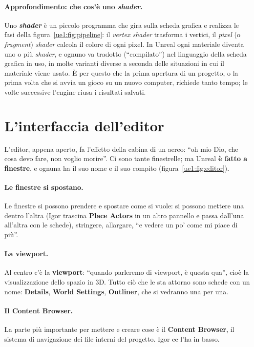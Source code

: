 \paragraph{Approfondimento: che cos'è uno \emph{shader}.} Uno \textbf{\emph{shader}} è un
piccolo programma che gira sulla scheda grafica e realizza le fasi della
figura~\ref{ue1:fig:pipeline}: il \emph{vertex shader} trasforma i vertici, il
\emph{pixel} (o \emph{fragment}) \emph{shader} calcola il colore di ogni pixel. In Unreal
ogni materiale diventa uno o più \emph{shader}, e ognuno va tradotto (``compilato'')
nel linguaggio della scheda grafica in uso, in molte varianti diverse a seconda delle
situazioni in cui il materiale viene usato. È per questo che la prima apertura di un
progetto, o la prima volta che si avvia un gioco su un nuovo computer, richiede tanto
tempo; le volte successive l'engine riusa i risultati salvati.

\section{L'interfaccia dell'editor}
\label{ue1:sec:interfaccia}

L'editor, appena aperto, fa l'effetto della cabina di un aereo: ``oh mio Dio, che cosa
devo fare, non voglio morire''. Ci sono tante finestrelle; ma Unreal \textbf{è fatto a
finestre}, e ognuna ha il suo nome e il suo compito (figura~\ref{ue1:fig:editor}).

\paragraph{Le finestre si spostano.} Le finestre si possono prendere e spostare come si
vuole: si possono mettere una dentro l'altra (Igor trascina \textbf{Place Actors} in un
altro pannello e passa dall'una all'altra con le schede), stringere, allargare, ``e
vedere un po' come mi piace di più''.

\paragraph{La viewport.} Al centro c'è la \textbf{viewport}: ``quando parleremo di
viewport, è questa qua'', cioè la visualizzazione dello spazio in 3D. Tutto ciò che le
sta attorno sono schede con un nome: \textbf{Details}, \textbf{World Settings},
\textbf{Outliner}, che si vedranno una per una.

\paragraph{Il Content Browser.} La parte più importante per mettere e creare cose è il
\textbf{Content Browser}, il sistema di navigazione dei file interni del progetto. Igor
ce l'ha in basso.

